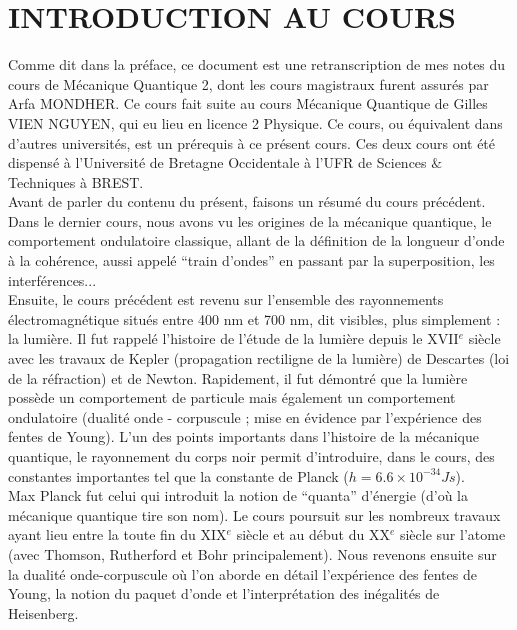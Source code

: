 \documentclass[12pt,a4paper,titlepage]{book}
\begin{document}
\newpage
\chapter*{INTRODUCTION AU COURS}

Comme dit dans la préface, ce document est une retranscription de mes notes du cours de Mécanique Quantique 2, dont les cours magistraux furent assurés par Arfa MONDHER. Ce cours fait suite au cours Mécanique Quantique de Gilles VIEN NGUYEN, qui eu lieu en licence 2 Physique. Ce cours, ou équivalent dans d'autres universités, est un prérequis à ce présent cours. Ces deux cours ont été dispensé à l'Université de Bretagne Occidentale à l'UFR de Sciences $\&$ Techniques à BREST.\\

Avant de parler du contenu du présent, faisons un résumé du cours précédent. Dans le dernier cours, nous avons vu les origines de la mécanique quantique, le comportement ondulatoire classique, allant de la définition de la longueur d'onde à la cohérence, aussi appelé \enquote{train d'ondes} en passant par la superposition, les interférences...\\

Ensuite, le cours précédent est revenu sur l'ensemble des rayonnements électromagnétique situés entre 400 nm et 700 nm, dit visibles, plus simplement : la lumière. Il fut rappelé l'histoire de l'étude de la lumière depuis le XVII$^e$ siècle avec les travaux de Kepler (propagation rectiligne de la lumière) de Descartes (loi de la réfraction) et de Newton. Rapidement, il fut démontré que la lumière possède un comportement de particule mais également un comportement ondulatoire (dualité onde - corpuscule ; mise en évidence par l'expérience des fentes de Young). L'un des points importants dans l'histoire de la mécanique quantique, le rayonnement du corps noir permit d'introduire, dans le cours, des constantes importantes tel que la constante de Planck ($h = 6.6 \times 10^{-34} Js$).\\

Max Planck fut celui qui introduit la notion de \enquote{quanta} d'énergie (d'où la mécanique quantique tire son nom). Le cours poursuit sur les nombreux travaux ayant lieu entre la toute fin du XIX$^e$ siècle et au début du XX$^e$ siècle sur l'atome (avec Thomson, Rutherford et Bohr principalement). Nous revenons ensuite sur la dualité onde-corpuscule où l'on aborde en détail l'expérience des fentes de Young, la notion du paquet d'onde et l'interprétation des inégalités de Heisenberg.\\
\end{document}
